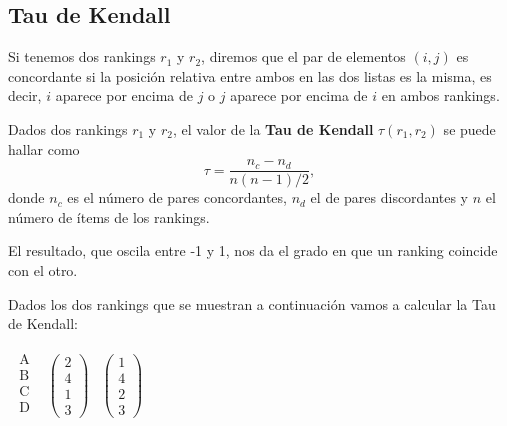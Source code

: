 \subsection{Tau de Kendall}

Si tenemos dos rankings $r_{1}$ y $r_{2}$, diremos que el par de elementos $(i,j)$ es concordante si la posición relativa entre ambos en las dos listas es la misma, es decir, $i$ aparece por encima de $j$ o $j$ aparece por encima de $i$ en ambos rankings.

\begin{defi} Dados dos rankings $r_{1}$ y $r_{2}$, el valor de la \textbf{Tau de Kendall} $\tau(r_{1},r_{2})$ se puede hallar como
	\begin{equation}
		\tau = \dfrac{n_{c} - n_{d}}{n(n-1)/2},
	\end{equation}
	donde $n_{c}$ es el número de pares concordantes, $n_{d}$ el de pares discordantes y $n$ el número de ítems de los rankings. 
\end{defi}

El resultado, que oscila entre -1 y 1, nos da el grado en que un ranking coincide con el otro. 

\begin{ejem} Dados los dos rankings que se muestran a continuación vamos a calcular la Tau de Kendall:
\end{ejem}
\begin{center}
$\begin{array}{ccc}
\begin{array}{c}
\text{A}\\
\text{B} \\
\text{C} \\
\text{D} \\
\end{array} & \left(\begin{array}{c}
2\\
4\\
1\\
3
\end{array} \right)& \left(\begin{array}{c}
1\\
4\\
2\\
3
\end{array} \right)
\end{array}$  
\end{center}


